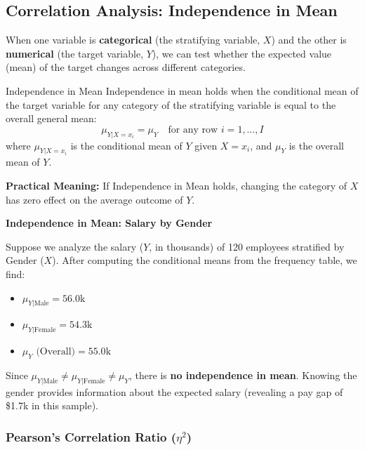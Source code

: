 \subsection{Correlation Analysis: Independence in Mean}

When one variable is \textbf{categorical} (the stratifying variable, $X$) and the other is \textbf{numerical} (the target variable, $Y$), we can test whether the expected value (mean) of the target changes across different categories.

\begin{defbox}{Independence in Mean}
Independence in mean holds when the conditional mean of the target variable for any category of the stratifying variable is equal to the overall general mean:
\begin{equation}
    \mu_{Y|X=x_i} = \mu_Y \quad \text{for any row } i = 1, \ldots, I
\end{equation}
where $\mu_{Y|X=x_i}$ is the conditional mean of $Y$ given $X = x_i$, and $\mu_Y$ is the overall mean of $Y$.
\end{defbox}

\textbf{Practical Meaning:} If Independence in Mean holds, changing the category of $X$ has zero effect on the average outcome of $Y$. 

\vspace{0.25cm}
\begin{example}{\textbf{Independence in Mean: Salary by Gender}}

Suppose we analyze the salary ($Y$, in thousands) of 120 employees stratified by Gender ($X$). 
After computing the conditional means from the frequency table, we find:
\begin{itemize}
    \item $\mu_{Y|\text{Male}} = 56.0\text{k}$
    \item $\mu_{Y|\text{Female}} = 54.3\text{k}$
    \item $\mu_Y \text{ (Overall)} = 55.0\text{k}$
\end{itemize}
Since $\mu_{Y|\text{Male}} \neq \mu_{Y|\text{Female}} \neq \mu_Y$, there is \textbf{no independence in mean}. Knowing the gender provides information about the expected salary (revealing a pay gap of \$1.7k in this sample).
\end{example}


\subsubsection{Pearson's Correlation Ratio ($\eta^2$)}

